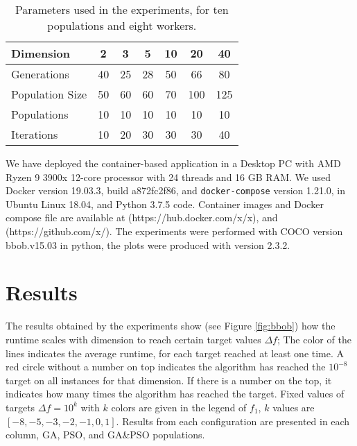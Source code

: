 \begin{table}[h!tb]
  \small
  \caption{Parameters used in the experiments, for ten populations and eight workers.
  }
  \label{tab:params:10}
  \vspace{0.25cm}
  \centering
  \small
  \begin{tabular}{|l|c|c|c|c|c|c|}
    \hline
    Dimension        & 2  & 3  & 5  & 10 & 20  & 40  \\ \hline
    Generations      & 40 & 25 & 28 & 50 & 66  & 80  \\ \hline
    Population Size  & 50 & 60 & 60 & 70 & 100 & 125 \\ \hline
    Populations      & 10 & 10 & 10 & 10 & 10  & 10  \\ \hline
    Iterations       & 10 & 20 & 30 & 30 & 30  & 40  \\ \hline  
  \end{tabular}
\end{table}

We have deployed the container-based application in a
Desktop PC with AMD Ryzen 9 3900x 12-core processor with 24 threads 
and 16 GB RAM. We used Docker version 19.03.3, build a872fc2f86, and {\tt docker-compose} version 1.21.0, 
in Ubuntu Linux 18.04, and Python 3.7.5 code. Container images and Docker compose file are available at
(https://hub.docker.com/x/x), and (https://github.com/x/). 
The experiments were performed with COCO \cite{hansen2016coco} version bbob.v15.03 in python, 
the plots were produced with version 2.3.2.


\section{Results}
\label{results}

The results obtained by the experiments show (see Figure \ref{fig:bbob}) how
the runtime scales with dimension to reach certain target values $\Delta f$;
The color of the lines indicates the average runtime, for each target reached
at least one time. A red circle without a number on top indicates the algorithm
has reached the $10^{-8}$ target on all instances for that dimension. If there
is a number on the top, it indicates how many times the algorithm has reached
the target. Fixed values of targets $\Delta f = 10^{k}$ with $k$ colors are
given in the legend of $f_1$, $k$ values are $[-8,-5,-3,-2,-1,0,1]$. Results
from each configuration are presented in each column, GA, PSO, and GA\&PSO
populations.

